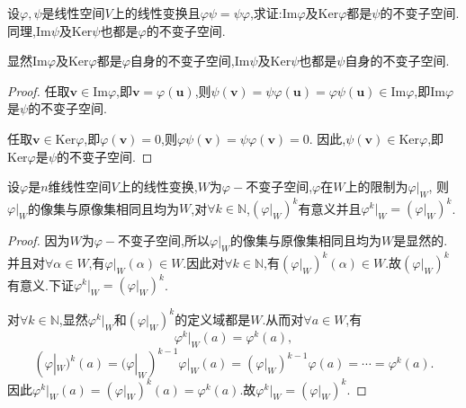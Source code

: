\documentclass[lang=cn,newtx,10pt,scheme=chinese]{elegantbook}
\begin{document}
\begin{proposition}\label{proposition:乘法可交换的线性变换值域和核互为不变子空间}
设\(\varphi,\psi\)是线性空间\(V\)上的线性变换且\(\varphi\psi = \psi\varphi\),求证:\(\text{Im}\varphi\)及\(\text{Ker}\varphi\)都是\(\psi\)的不变子空间.同理,\(\text{Im}\psi\)及\(\text{Ker}\psi\)也都是\(\varphi\)的不变子空间.
\end{proposition}
\begin{note}
    显然\(\text{Im}\varphi\)及\(\text{Ker}\varphi\)都是\(\varphi\)自身的不变子空间,\(\text{Im}\psi\)及\(\text{Ker}\psi\)也都是\(\psi\)自身的不变子空间.
\end{note}
\begin{proof}
任取\(\boldsymbol{v}\in\text{Im}\varphi\),即\(\boldsymbol{v}=\varphi(\boldsymbol{u})\),则\(\psi(\boldsymbol{v})=\psi\varphi(\boldsymbol{u})=\varphi\psi(\boldsymbol{u})\in\text{Im}\varphi\),即\(\text{Im}\varphi\)是\(\psi\)的不变子空间.

任取\(\boldsymbol{v}\in\text{Ker}\varphi\),即\(\varphi(\boldsymbol{v}) = 0\),则\(\varphi\psi(\boldsymbol{v})=\psi\varphi(\boldsymbol{v}) = 0\). 因此,\(\psi(\boldsymbol{v})\in\text{Ker}\varphi\),即\(\text{Ker}\varphi\)是\(\psi\)的不变子空间.
\end{proof}

\begin{proposition}\label{proposition:线性变换在其不变子空间下的限制}
    设\(\varphi\)是\(n\)维线性空间\(V\)上的线性变换,\(W\)为\(\varphi -\)不变子空间,\(\varphi\)在\(W\)上的限制为\(\varphi|_W\),
    则\(\varphi|_W\)的像集与原像集相同且均为\(W\),对\(\forall k\in \mathbb{N}\),\((\varphi|_W)^k\)有意义并且\(\varphi^k|_W = (\varphi|_W)^k\).    
\end{proposition}
\begin{proof}
    因为\(W\)为\(\varphi -\)不变子空间,所以\(\varphi|_W\)的像集与原像集相同且均为\(W\)是显然的.
    并且对\(\forall \alpha \in W\),有\(\varphi|_W(\alpha) \in W\).因此对\(\forall k \in \mathbb{N}\),有\((\varphi|_W)^k(\alpha) \in W\).故\((\varphi|_W)^k\)有意义.下证\(\varphi^k|_W = (\varphi|_W)^k\).

    对\(\forall k\in \mathbb{N}\),显然\(\varphi^k|_W\)和\((\varphi|_W)^k\)的定义域都是\(W\).从而对\(\forall a\in W\),有
    \[
    \varphi^k|_W(a)=\varphi^k(a),
    \]
    \[
    (\varphi|_W)^k(a)=(\varphi|_W)^{k - 1}\varphi|_W(a)=(\varphi|_W)^{k - 1}\varphi(a)=\cdots=\varphi^k(a).
    \]
    因此\(\varphi^k|_W(a)=(\varphi|_W)^k(a)=\varphi^k(a)\).故\(\varphi^k|_W = (\varphi|_W)^k\).
\end{proof}
\end{document}
